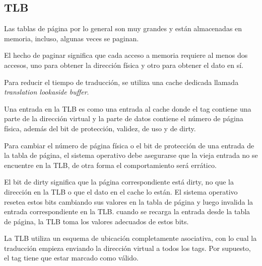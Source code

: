 \subsection{TLB}
Las tablas de página por lo general son muy grandes y están almacenadas en memoria, incluso, algunas veces se paginan.

El hecho de paginar significa que cada acceso a memoria requiere al menos dos accesos, uno para obtener la dirección física y otro para obtener el dato en sí.

Para reducir el tiempo de traducción, se utiliza una cache dedicada llamada \textit{translation lookaside buffer}.

Una entrada en la TLB es como una entrada al cache donde el tag contiene una parte de la dirección virtual y la parte de datos contiene el número de página física, además del bit de protección, validez, de uso y de dirty.

Para cambiar el número de página física o el bit de protección de una entrada de la tabla de página, el sistema operativo debe asegurarse que la vieja entrada no se encuentre en la TLB, de otra forma el comportamiento será errático. 

El bit de dirty significa que la página correspondiente está dirty, no que la dirección en la TLB o que el dato en el cache lo están. El sistema operativo resetea estos bits cambiando sus valores en la tabla de página y luego invalida la entrada correspondiente en la TLB. cuando se recarga la entrada desde la tabla de página, la TLB toma los valores adecuados de estos bits.

La TLB utiliza un esquema de ubicación completamente asociativa, con lo cual la traducción empieza enviando la dirección virtual a todos los tags. Por supuesto, el tag tiene que estar marcado como válido.
